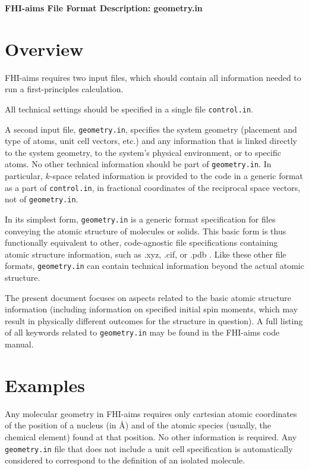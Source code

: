 \documentclass[11pt,letterpaper]{article}
\begin{document}
\begin{flushleft} 
\noindent\Large\textbf{FHI-aims File Format Description: geometry.in}
\end{flushleft}

\section{Overview}

FHI-aims requires two input files, which should contain all
information needed to run a first-principles calculation. 

All technical settings should be specified in a single file
\texttt{control.in}. 

A second input file, \texttt{geometry.in},
specifies the system geometry (placement and type of
atoms, unit cell vectors, etc.) and any information that is linked
directly to the system geometry, to the system's physical environment,
or to specific atoms. No other technical information should be part of 
\texttt{geometry.in}. In particular, $k$-space related information is
provided to the code in a generic format as a part of
\texttt{control.in}, in fractional coordinates of the reciprocal space
vectors, not of \texttt{geometry.in}. 

In its simplest form, \texttt{geometry.in} is a generic format
specification for files conveying the atomic structure of molecules or
solids. This basic form is thus functionally equivalent to
other, code-agnostic file specifications containing atomic structure
information, such as .xyz, .cif, or .pdb . Like these other file
formats, \texttt{geometry.in} can contain technical information beyond
the actual atomic structure. 

The present document focuses on aspects related to the basic atomic
structure information (including information on specified initial spin
moments, which may result in physically different outcomes for the
structure in question). A full listing of all keywords related to
\texttt{geometry.in} may be found in the FHI-aims code manual.

\section{Examples}

Any molecular geometry in FHI-aims requires only cartesian atomic
coordinates of the position of a nucleus (in {\AA}) and of the atomic
species (usually, the chemical element) found at that position. No
other information is required. Any \texttt{geometry.in} file that does
not include a unit cell specification is automatically considered to
correspond to the definition of an isolated molecule.
\end{document}
